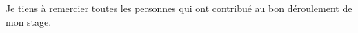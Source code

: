 \begin{flushright}
Je tiens à remercier toutes les personnes qui ont contribué au bon déroulement de mon stage.
\end{flushright}
